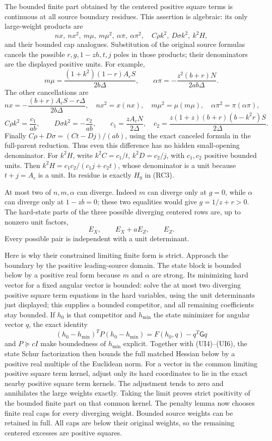 The bounded finite part obtained by the centered positive square terms is
continuous at all source boundary residues. This assertion is
algebraic: its only large-weight products are
\[
 nx,\ nx^2,\ m\mu,\ m\mu^2,\ \alpha\pi,\ \alpha\pi^2,
 \quad C\rho k^2,\ D\sigma k^2,\ k^2H,
\]
and their bounded cap analogues. Substitution of the original source
formulas cancels the possible $r,g,1-zh,t,j$ poles in those products;
their denominators are the displayed positive units. For example,
\[
 m\mu=\frac{(1+k^2)(1-r)A_cS}{2b\Delta},\qquad
 \alpha\pi=-\frac{z^2(b+r)N}{2ab\Delta}.
\]
The other cancellations are
\[
 nx=-\frac{(b+r)A_cS-r\Delta}{2b\Delta},\quad
 nx^2=x(nx),\quad m\mu^2=\mu(m\mu),\quad
 \alpha\pi^2=\pi(\alpha\pi),
\]
\[
 C\rho k^2=\frac{c_1}{ab},\qquad
 D\sigma k^2=-\frac{c_2}{ab},\qquad
 c_1=\frac{zA_cN}{2\Delta},\quad
 c_2=\frac{z(1+z)(b+r)(b-k^2r)S}{2\Delta}.
\]
Finally $C\rho+D\sigma=(Ct-Dj)/(ab)$, using the exact canceled
formula in the full-parent reduction. Thus even this difference has
no hidden small-opening denominator.
For $k^2H$, write $k^2C=c_1/t$, $k^2D=c_2/j$, with
$c_1,c_2$ positive bounded units. Then
$k^2H=c_1c_2/(c_1j+c_2t)$, whose denominator is a unit because
$t+j=A_c$ is a unit. Its residue is exactly $H_0$ in (RC3).

At most two of $n,m,\alpha$ can diverge. Indeed $m$ can diverge
only at $g=0$, while $\alpha$ can diverge only at $1-zb=0$;
these two equalities would give $g=1/z+r>0$. The hard-state parts
of the three possible diverging centered rows are, up to nonzero
unit factors,
\[
                   E_X,\qquad E_X+aE_Z,\qquad E_Z.
\]
Every possible pair is independent with a unit determinant.

Here is why their constrained limiting finite form is strict.
Approach the boundary by the positive leading-source domain. The
state block is bounded below by a positive real form because $m$ and
$\alpha$ are strong. Its minimizing hard vector for a fixed angular
vector is bounded: solve the at most two diverging positive square term equations
in the hard variables, using the unit determinants just displayed;
this supplies a bounded competitor, and all remaining coefficients
stay bounded. If $h_0$ is that competitor and $h_{\min}$ the state
minimizer for angular vector $q$, the exact identity
\[
 (h_0-h_{\min})^TP(h_0-h_{\min})
       =F(h_0,q)-q^T\mathsf Gq
\]
and $P\succeq cI$ make boundedness of $h_{\min}$ explicit.
Together with (UI4)--(UI6), the state Schur factorization
then bounds the full matched Hessian below by a positive real multiple
of the Euclidean norm. For a vector in the common limiting positive square term
kernel, adjust only its hard coordinates to lie in the exact nearby
positive square term kernels. The adjustment tends to zero and annihilates the
large weights exactly. Taking the limit proves strict positivity of
the bounded finite part on that common kernel. The penalty lemma now
chooses finite real caps for every diverging weight. Bounded source
weights can be retained in full. All caps are below their original
weights, so the remaining centered excesses are positive squares.

